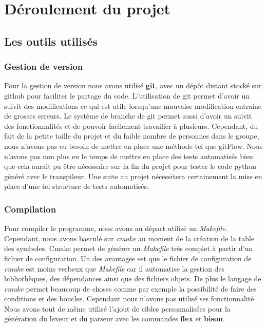 \documentclass[a4paper]{article}%
\begin{document}
\section{Déroulement du projet}

\subsection{Les outils utilisés}

\subsubsection{Gestion de version}

Pour la gestion de version nous avons utilisé \textbf{git}, avec un dépôt
distant stocké sur github pour faciliter le partage du code. L'utilisation de
git permet d'avoir un suivit des modifications ce qui est utile lorsqu'une
mauvaise modification entraine de grosses erreurs. Le système de branche de git
permet aussi d'avoir un suivit des fonctionnalités et de pouvoir facilement
travailler à plusieurs. Cependant, du fait de la petite taille du projet et du
faible nombre de personnes dans le groupe, nous n'avons pas eu besoin de mettre
en place une méthode tel que gitFlow. Nous n'avons pas non plus eu le temps de
mettre en place des tests automatisés bien que cela aurait pu être nécessaire
sur la fin du projet pour tester le code python généré avec le transpileur. Une
suite au projet nécessitera certainement la mise en place d'une tel structure de
tests automatisés.\\

\subsubsection{Compilation}

Pour compiler le programme, nous avons au départ utilisé un \textit{Makefile}.
Cependant, nous avons basculé sur \textit{cmake} au moment de la création de la
table des symboles. Cmake permet de générer un \textit{Makefile} très complet à
partir d'un fichier de configuration. Un des avantages est que le fichier de
configuration de \textit{cmake} est moins verbeux que \textit{Makefile} car il
automatise la gestion des bibliothèques, des dépendances ainsi que des fichiers
objets. De plus le langage de \textit{cmake} permet beaucoup de choses comme par
exemple la possibilité de faire des conditions et des boucles. Cependant nous
n'avons pas utilisé ses fonctionnalité. Nous avons tout de même utilisé l'ajout
de cibles personnalisées pour la génération du lexeur et du parseur avec les
commandes \textbf{flex} et \textbf{bison}.
\end{document}
